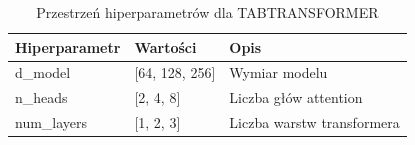 \begin{table}[h]
\centering
\caption{Przestrzeń hiperparametrów dla TABTRANSFORMER}
\label{tab:hyperparams_tabtransformer}
\begin{tabular}{lll}
\toprule
Hiperparametr & Wartości & Opis \\
\midrule
d\_model & [64, 128, 256] & Wymiar modelu \\
n\_heads & [2, 4, 8] & Liczba głów attention \\
num\_layers & [1, 2, 3] & Liczba warstw transformera \\
\bottomrule
\end{tabular}
\end{table}
